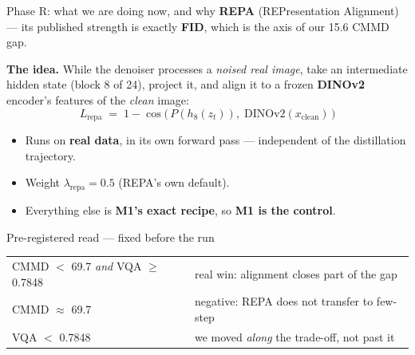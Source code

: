 \documentclass[10pt,aspectratio=169]{beamer}
\begin{document}
\begin{frame}{Phase R: what we are doing now, and why}
  \textbf{REPA} (REPresentation Alignment) --- its published strength is exactly \textbf{FID},
  which is the axis of our 15.6 CMMD gap.

  \vspace{0.8em}
  \textbf{The idea.} While the denoiser processes a \emph{noised real image}, take an
  intermediate hidden state (block 8 of 24), project it, and align it to a frozen
  \textbf{DINOv2} encoder's features of the \emph{clean} image:
  \[
    L_{\text{repa}} \;=\; 1 - \cos\big(\,P(h_8(z_t)),\; \text{DINOv2}(x_{\text{clean}})\,\big)
  \]
  \begin{itemize}
    \item Runs on \textbf{real data}, in its own forward pass --- independent of the
          distillation trajectory.
    \item Weight $\lambda_{\text{repa}} = 0.5$ (REPA's own default).
    \item Everything else is \textbf{M1's exact recipe}, so \textbf{M1 is the control}.
  \end{itemize}

  \begin{block}{Pre-registered read --- fixed before the run}
    \begin{tabular}{ll}
      CMMD $<$ 69.7 \emph{and} VQA $\geq$ 0.7848 & real win: alignment closes part of the gap \\
      CMMD $\approx$ 69.7 & negative: REPA does not transfer to few-step \\
      VQA $<$ 0.7848 & we moved \emph{along} the trade-off, not past it \\
    \end{tabular}
  \end{block}
\end{frame}
\end{document}
